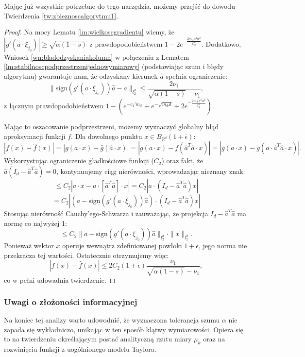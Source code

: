 Mając już wszystkie potrzebne do tego narzędzia, możemy przejść do dowodu Twierdzenia \ref{tw:zbieznoscalgorytmu1}.

\begin{proof}
Na mocy Lematu \ref{lm:wielkoscgradientu} wiemy, że $|g'(a \cdot \xi_{j_0})| \ge \sqrt{\alpha(1-s)}$ z prawdopodobieństwem $1 - 2e^{-\frac{2m_\mathcal{X} s^2 \alpha^2}{C_2^4}}$. Dodatkowo, Wniosek \ref{wn:bladodzyskaniakolumn} w połączeniu z Lematem \ref{lm:stabilnoscpodprzestrzenijednowymiarowy} (podstawiając szum i błędy algorytmu) gwarantuje nam, że odzyskany kierunek $\hat{a}$ spełnia ograniczenie:
$$\|\text{sign}(g'(a \cdot \xi_{j_0}))\hat{a} - a\|_{l_2^d} \le \frac{2\nu_1}{\sqrt{\alpha(1-s)} - \nu_1},$$ 
z łącznym prawdopodobieństwem $1 - \left(e^{-c_1' m_\Phi} + e^{-\sqrt{m_\Phi d}} + 2e^{-\frac{2m_\mathcal{X} s^2 \alpha^2}{C_2^4}}\right)$.

Mając to oszacowanie podprzestrzeni, możemy wyznaczyć globalny błąd aproksymacji funkcji $f$. Dla dowolnego punktu $x \in B_{\mathbb{R}^d}(1+\bar{\epsilon})$:
$$|f(x) - \hat{f}(x)| = |g(a \cdot x) - \hat{g}(\hat{a} \cdot x)| = |g(a \cdot x) - f(\hat{a}^T \hat{a} \cdot x)| = |g(a \cdot x) - g(a \cdot \hat{a}^T \hat{a} \cdot x)|.$$ 
Wykorzystując ograniczenie gładkościowe funkcji ($C_2$) oraz fakt, że $\hat{a}(I_d - \hat{a}^T \hat{a}) = 0$, kontynuujemy ciąg nierówności, wprowadzając nieznany znak:
$$\le C_2 |a \cdot x - a \cdot [\hat{a}^T \hat{a}] \cdot x| = C_2 |a \cdot (I_d - \hat{a}^T \hat{a})x|$$ 
$$= C_2 |(a - \text{sign}(g'(a \cdot \xi_{j_0}))\hat{a}) \cdot (I_d - \hat{a}^T \hat{a})x|$$ 
Stosując nierówność Cauchy'ego-Schwarza i zauważając, że projekcja $I_d - \hat{a}^T \hat{a}$ ma normę co najwyżej 1:
$$\le C_2 \|a - \text{sign}(g'(a \cdot \xi_{j_0}))\hat{a}\|_{l_2^d} \cdot \|x\|_{l_2^d}.$$ 
Ponieważ wektor $x$ operuje wewnątrz zdefiniowanej powłoki $1+\bar{\epsilon}$, jego norma nie przekracza tej wartości. Ostatecznie otrzymujemy więc:
$$|f(x) - \hat{f}(x)| \le 2C_2(1+\bar{\epsilon})\frac{\nu_1}{\sqrt{\alpha(1-s)} - \nu_1},$$ 
co w pełni udowadnia twierdzenie.
\end{proof}

\subsubsection{Uwagi o złożoności informacyjnej}
Na koniec tej analizy warto udowodnić, że wyznaczona tolerancja szumu $\alpha$ nie zapada się wykładniczo, unikając w ten sposób klątwy wymiarowości. Opiera się to na twierdzeniu określającym postać analityczną rzutu miary $\mu_k$ \cite{rudin1980function}  oraz na rozwinięciu funkcji z uogólnionego modelu Taylora.


